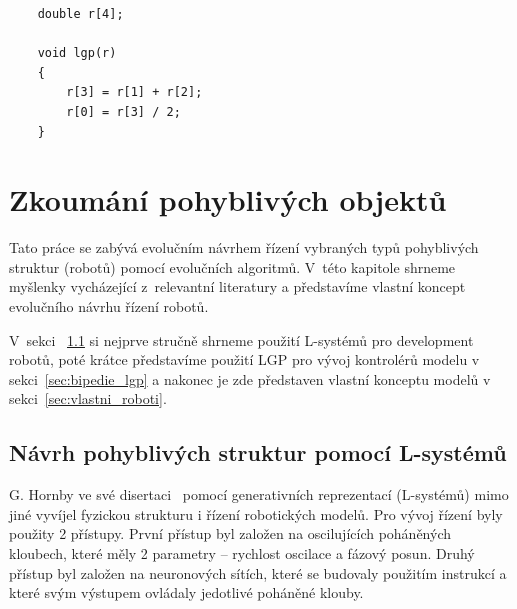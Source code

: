 
\begin{lstlisting}
    double r[4];

    void lgp(r)
    {
        r[3] = r[1] + r[2];
        r[0] = r[3] / 2;
    }
\end{lstlisting}


\chapter{Zkoumání pohyblivých objektů}
\label{chap:zkoumani_pohyblivych_objektu}

Tato práce se zabývá evolučním návrhem řízení vybraných typů pohyblivých struktur (robotů) pomocí evolučních algoritmů.
V~této kapitole shrneme myšlenky vycházející z~relevantní literatury a představíme vlastní koncept evolučního návrhu řízení robotů.

V~sekci ~\ref{sec:l_systemy} si nejprve stručně shrneme použití L-systémů pro development robotů, poté krátce představíme použití LGP pro vývoj kontrolérů modelu v sekci~\ref{sec:bipedie_lgp} a nakonec je zde představen vlastní konceptu modelů v sekci~\ref{sec:vlastni_roboti}.

\section{Návrh pohyblivých struktur pomocí L-systémů}
\label{sec:l_systemy}

G. Hornby ve své disertaci~\cite{Hornby2003} pomocí generativních reprezentací (L-systémů) mimo jiné vyvíjel fyzickou strukturu i řízení robotických modelů.
Pro vývoj řízení byly použity 2 přístupy.
První přístup byl založen na oscilujících poháněných kloubech, které měly 2 parametry -- rychlost oscilace a fázový posun.
Druhý přístup byl založen na neuronových sítích, které se budovaly použitím instrukcí a které svým výstupem ovládaly jedotlivé poháněné klouby.

